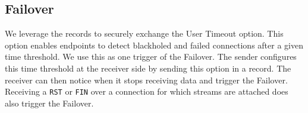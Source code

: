 %
%




\subsection{Failover}
\label{sec:prot-migration}

We leverage the \tcpls records to securely exchange the \tcp User Timeout option.
This option enables endpoints to detect blackholed and failed \tcp connections
after a given time threshold. We use this as one trigger of the Failover. The 
sender configures this time threshold at the receiver side by sending this \tcp 
option in a \tcpls record. The receiver can then notice when it stops receiving 
data and trigger the Failover.
Receiving a \tcp \texttt{RST} or \texttt{FIN} over a \tcp connection for which
\tcpls streams are attached does also trigger the Failover.

